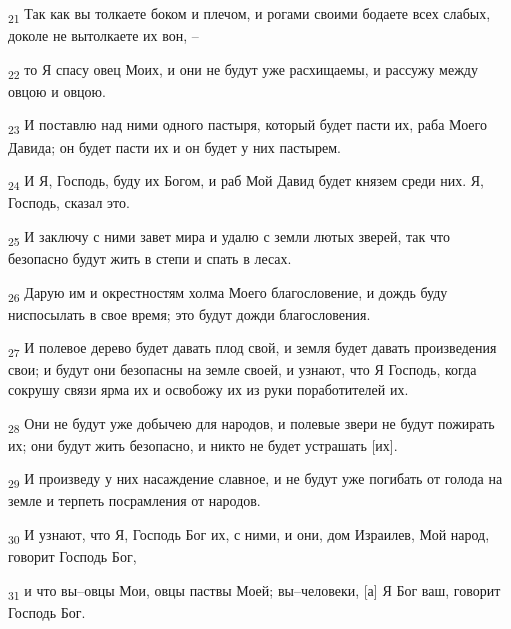 \begin{tcolorbox}
\textsubscript{21} Так как вы толкаете боком и плечом, и рогами своими бодаете всех слабых, доколе не вытолкаете их вон, --
\end{tcolorbox}
\begin{tcolorbox}
\textsubscript{22} то Я спасу овец Моих, и они не будут уже расхищаемы, и рассужу между овцою и овцою.
\end{tcolorbox}
\begin{tcolorbox}
\textsubscript{23} И поставлю над ними одного пастыря, который будет пасти их, раба Моего Давида; он будет пасти их и он будет у них пастырем.
\end{tcolorbox}
\begin{tcolorbox}
\textsubscript{24} И Я, Господь, буду их Богом, и раб Мой Давид будет князем среди них. Я, Господь, сказал это.
\end{tcolorbox}
\begin{tcolorbox}
\textsubscript{25} И заключу с ними завет мира и удалю с земли лютых зверей, так что безопасно будут жить в степи и спать в лесах.
\end{tcolorbox}
\begin{tcolorbox}
\textsubscript{26} Дарую им и окрестностям холма Моего благословение, и дождь буду ниспосылать в свое время; это будут дожди благословения.
\end{tcolorbox}
\begin{tcolorbox}
\textsubscript{27} И полевое дерево будет давать плод свой, и земля будет давать произведения свои; и будут они безопасны на земле своей, и узнают, что Я Господь, когда сокрушу связи ярма их и освобожу их из руки поработителей их.
\end{tcolorbox}
\begin{tcolorbox}
\textsubscript{28} Они не будут уже добычею для народов, и полевые звери не будут пожирать их; они будут жить безопасно, и никто не будет устрашать [их].
\end{tcolorbox}
\begin{tcolorbox}
\textsubscript{29} И произведу у них насаждение славное, и не будут уже погибать от голода на земле и терпеть посрамления от народов.
\end{tcolorbox}
\begin{tcolorbox}
\textsubscript{30} И узнают, что Я, Господь Бог их, с ними, и они, дом Израилев, Мой народ, говорит Господь Бог,
\end{tcolorbox}
\begin{tcolorbox}
\textsubscript{31} и что вы--овцы Мои, овцы паствы Моей; вы--человеки, [а] Я Бог ваш, говорит Господь Бог.
\end{tcolorbox}
